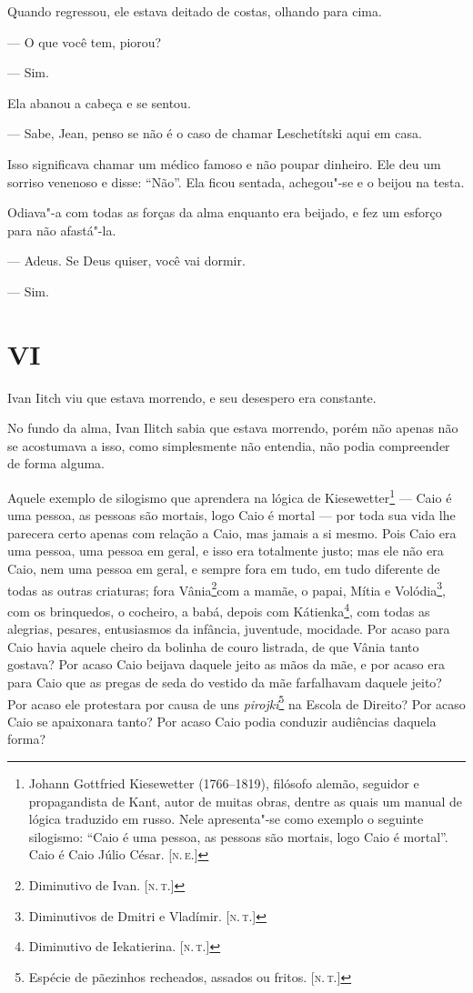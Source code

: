 Quando regressou, ele estava deitado de costas, olhando para cima.

--- O que você tem, piorou?

--- Sim.

Ela abanou a cabeça e se sentou.

--- Sabe, Jean, penso se não é o caso de chamar Leschetítski aqui em casa.

Isso significava chamar um médico famoso e não poupar dinheiro. Ele deu
um sorriso venenoso e disse: ``Não''. Ela ficou sentada, achegou"-se e o
beijou na testa.

Odiava"-a com todas as forças da alma enquanto era beijado, e fez um
esforço para não afastá"-la.

--- Adeus. Se Deus quiser, você vai dormir.

--- Sim.

\section{VI}

Ivan Iitch viu que estava morrendo, e seu desespero era constante.

No fundo da alma, Ivan Ilitch sabia que estava morrendo, porém não
apenas não se acostumava a isso, como simplesmente não entendia, não
podia compreender de forma alguma.

Aquele exemplo de silogismo que aprendera na lógica de
Kiesewetter\footnote{Johann Gottfried Kiesewetter (1766--1819), filósofo
  alemão, seguidor e propagandista de Kant, autor de muitas obras,
  dentre as quais um manual de lógica traduzido em russo. Nele
  apresenta"-se como exemplo o seguinte silogismo: ``Caio é uma pessoa,
  as pessoas são mortais, logo Caio é mortal''. Caio é Caio Júlio César.
  {[}\textsc{n.\,e.}{]}} --- Caio é uma pessoa, as pessoas são mortais, logo Caio é
mortal --- por toda sua vida lhe parecera certo apenas com relação a
Caio, mas jamais a si mesmo. Pois Caio era uma pessoa, uma pessoa em
geral, e isso era totalmente justo; mas ele não era Caio, nem uma pessoa
em geral, e sempre fora em tudo, em tudo diferente de todas as outras
criaturas; fora Vânia\footnote{Diminutivo de Ivan. {[}\textsc{n.\,t.}{]}}com a
mamãe, o papai, Mítia e Volódia\footnote{Diminutivos de Dmitri e
  Vladímir. {[}\textsc{n.\,t.}{]}}, com os brinquedos, o cocheiro, a babá, depois
com Kátienka\footnote{Diminutivo de Iekatierina. {[}\textsc{n.\,t.}{]}}, com todas
as alegrias, pesares, entusiasmos da infância, juventude, mocidade. Por
acaso para Caio havia aquele cheiro da bolinha de couro listrada, de que
Vânia tanto gostava? Por acaso Caio beijava daquele jeito as mãos da
mãe, e por acaso era para Caio que as pregas de seda do vestido da mãe
farfalhavam daquele jeito? Por acaso ele protestara por causa de uns
\emph{pirojkí}\footnote{Espécie de pãezinhos recheados, assados ou
  fritos. {[}\textsc{n.\,t.}{]}} na Escola de Direito? Por acaso Caio se apaixonara
tanto? Por acaso Caio podia conduzir audiências daquela forma?

